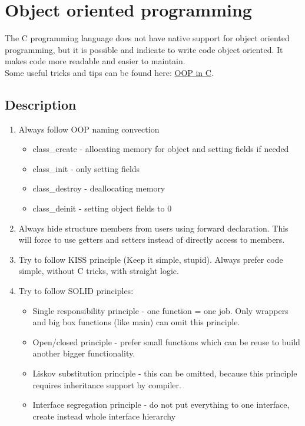 \section{Object oriented programming}
The C programming language does not have native support for object oriented programming, but it is possible and indicate to write code object oriented. It makes code more readable and easier to maintain. \\
Some useful tricks and tips can be found here: \href{https://github.com/Kukos/OOP-in-C}{OOP in C}.
\subsection{Description}
\begin{enumerate}
    \item Always follow OOP naming convection
        \begin{itemize}
            \item class\_create - allocating memory for object and setting fields if needed
            \item class\_init - only setting fields
            \item class\_destroy - deallocating memory
            \item class\_deinit - setting object fields to 0
        \end{itemize}
    \item Always hide structure members from users using forward declaration. This will force to use getters and setters instead of directly access to members.
    \item Try to follow KISS principle (Keep it simple, stupid). Always prefer code simple, without C tricks, with straight logic.
    \item Try to follow SOLID principles:
        \begin{itemize}
            \item Single responsibility principle - one function = one job. Only wrappers and big box functions (like main) can omit this principle.
            \item Open/closed principle - prefer small functions which can be reuse to build another bigger functionality.
            \item Liskov substitution principle - this can be omitted, because this principle requires inheritance support by compiler.
            \item Interface segregation principle - do not put everything to one interface, create instead whole interface hierarchy

\end{itemize}
\end{enumerate}
